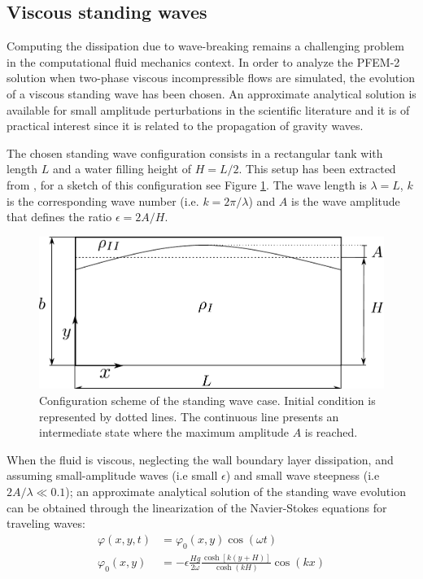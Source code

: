 \subsection{Viscous standing waves}%

Computing the dissipation due to wave-breaking remains a challenging problem in the computational fluid mechanics context. In order to analyze the PFEM-2 solution when two-phase viscous incompressible flows are simulated, the evolution of a viscous standing wave has been chosen. An approximate analytical solution is available for small amplitude perturbations in the scientific literature \cite{Lighthill01} and it is of practical interest since it is related to the propagation of gravity waves.

The chosen standing wave configuration consists in a rectangular tank with length $L$ and a water filling height of $H = L/2$. This setup has been extracted from \cite{Colagrossi12}, for a sketch of this configuration see Figure \ref{fg:standing-wave-config}. The wave length is $\lambda = L$, $k$ is the corresponding wave number (i.e. $k = 2\pi/\lambda$) and $A$ is the wave amplitude that defines the ratio $\epsilon=2A/H$.

\begin{figure}[H]
  \begin{center}
      \includegraphics[width=.7\columnwidth]{images/standing_wave.pdf}
  \end{center}
  \caption{\label{fg:standing-wave-config} Configuration scheme of the standing wave case. Initial condition is represented by dotted lines. The continuous line presents an intermediate state where the maximum amplitude $A$ is reached.}
\end{figure}

When the fluid is viscous, neglecting the wall boundary layer dissipation, and assuming small-amplitude waves (i.e small $\epsilon$) and small wave steepness (i.e $2A/\lambda \ll 0.1$); an approximate analytical solution of the standing wave evolution can be obtained through the linearization of the Navier-Stokes equations for traveling waves:
\begin{align}
 \varphi(x,y,t) & = \varphi_0(x,y)\cos(\omega t) \\
 \varphi_0(x,y) & =-\epsilon\frac{Hg}{2\omega}\frac{\cosh\left[k(y+H)\right]}{\cosh(kH)}\cos(kx)
\end{align}

